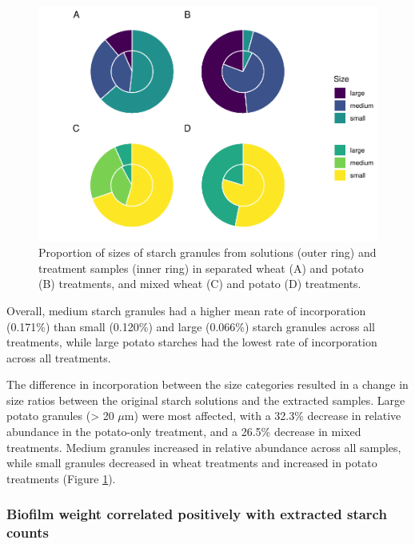 \documentclass[
]{article}
\begin{document}
\begin{figure}

{\centering \includegraphics{../figures/ratio-plots-1} 

}

\caption{Proportion of sizes of starch granules from solutions (outer ring) and treatment samples (inner ring) in separated wheat (A) and potato (B) treatments, and mixed wheat (C) and potato (D) treatments.}\label{fig:ratio-plots}
\end{figure}

Overall, medium starch granules had a higher mean rate of incorporation
(0.171\%)
than small
(0.120\%)
and large
(0.066\%)
starch granules across all treatments, while large potato starches had the lowest
rate of incorporation across all treatments.

The difference in incorporation between the size categories resulted in a change
in size ratios between the original starch solutions and the extracted samples.
Large potato granules (\textgreater{} 20 \(\mu\)m) were most affected, with a
32.3\%
decrease in relative abundance in the potato-only treatment, and a
26.5\%
decrease in mixed treatments. Medium granules increased in relative abundance
across all samples, while small granules decreased in wheat treatments and
increased in potato treatments
(Figure \ref{fig:ratio-plots}).

\hypertarget{biofilm-weight-correlated-positively-with-extracted-starch-counts}{%
\subsubsection{Biofilm weight correlated positively with extracted starch counts}\label{biofilm-weight-correlated-positively-with-extracted-starch-counts}}
\end{document}
